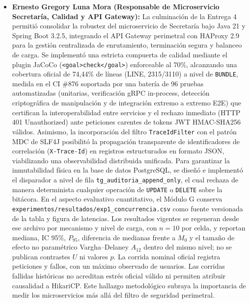 \documentclass[11pt,a4paper]{article}
\begin{document}
\begin{itemize}[leftmargin=*]
  \item \textbf{Ernesto Gregory Luna Mora (Responsable de Microservicio Secretar\'ia, Calidad y API Gateway):} La culminaci\'on de la Entrega 4 permiti\'o consolidar la robustez del microservicio de Secretar\'ia bajo Java 21 y Spring Boot 3.2.5, integrando el API Gateway perimetral con HAProxy 2.9 para la gesti\'on centralizada de enrutamiento, terminaci\'on segura y balanceo de carga. Se implement\'o una estricta compuerta de calidad mediante el plugin JaCoCo (\texttt{<goal>check</goal>}) enforceable al 70\%, alcanzando una cobertura oficial de 74,44\% de l\'ineas (LINE, 2315/3110) a nivel de \texttt{BUNDLE}, medida en el CI \#876 soportada por una bater\'ia de 96 pruebas automatizadas (unitarias, verificaci\'on gRPC in-process, detecci\'on criptogr\'afica de manipulaci\'on y de integraci\'on extremo a extremo E2E) que certifican la interoperabilidad entre servicios y el rechazo inmediato (HTTP 401 Unauthorized) ante peticiones carentes de tokens JWT HMAC-SHA256 v\'alidos. Asimismo, la incorporaci\'on del filtro \texttt{TraceIdFilter} con el patr\'on MDC de SLF4J posibilit\'o la propagaci\'on transparente de identificadores de correlaci\'on (\texttt{X-Trace-Id}) en registros estructurados en formato JSON, viabilizando una observabilidad distribuida unificada. Para garantizar la inmutabilidad f\'isica en la base de datos PostgreSQL, se dise\~n\'o e implement\'o el disparador a nivel de fila \texttt{tg\_auditoria\_append\_only}, el cual rechaza de manera determinista cualquier operaci\'on de \texttt{UPDATE} o \texttt{DELETE} sobre la bit\'acora. En el aspecto evaluativo cuantitativo, el M\'odulo G conserva \texttt{experimentos/resultados/exp1\_concurrencia.csv} como fuente versionada de la tabla y figura de latencias. Los resultados vigentes se regeneran desde ese archivo por mecanismo y nivel de carga, con $n=10$ por celda, y reportan mediana, IC 95\%, $P_{95}$, diferencia de medianas frente a $M_0$ y el tama\~no de efecto no param\'etrico Vargha--Delaney $A_{12}$ dentro del mismo nivel; no se publican contrastes $U$ ni valores $p$. La corrida nominal oficial registra \CargaPeticiones{} peticiones y \CargaFallos{} fallos, con un m\'aximo observado de \CargaUsuariosMaximos{} usuarios. Las corridas fallidas hist\'oricas no acreditan estr\'es oficial v\'alido ni permiten atribuir causalidad a HikariCP. Este hallazgo metodol\'ogico subraya la importancia de medir los microservicios m\'as all\'a del filtro de seguridad perimetral.


\end{itemize}
\end{document}
